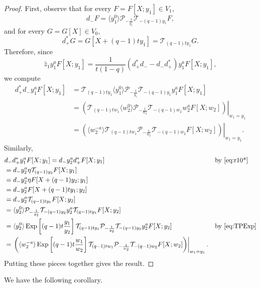 \documentclass[reqno]{amsart}
\theoremstyle{plain}
\theoremstyle{definition}
\theoremstyle{remark}
\DeclareMathOperator{\Exp}{Exp}
\newcommand{\z}{\widehat{z}}
\newcommand{\<}{\langle}
\renewcommand{\>}{\rangle}
\begin{document}
\begin{proof}
    First, observe that for every $F = F[X;y_1]\in V_1$,
    \[ d_- F =\langle y_1^0 \rangle\mathcal{P}_{-\frac{1}{y_1}} \mathcal{T}_{-(q-1)y_1}F, \]
    and for every $G = G[X] \in V_0$,
    \[ d_+^* G = G[X + (q-1) t y_1] = \mathcal{T}_{(q-1)t y_1} G. \]
    Therefore, since
    \[ \z_1 y_1^a F[X;y_1] = \frac{1}{t(1-q)}(d_+^*d_- - d_- d_+^*) y_1^a F[X;y_1], \]
    we compute
    \begin{align*}
        d_+^*d_- y_1^a F[X;y_1] & = \mathcal{T}_{(q-1)t y_1} \langle y_1^0 \rangle\mathcal{P}_{-\frac{1}{y_1}} \mathcal{T}_{-(q-1)y_1} y_1^a F[X;y_1] \\
        & = \left. \left(\mathcal{T}_{(q-1)t w_1} \langle w_2^0 \rangle\mathcal{P}_{-\frac{1}{w_2}} \mathcal{T}_{-(q-1)w_2} w_2^a F[X;w_2]\right) \right\rvert_{w_1=y_1} \\
        & = \left. \left(\langle w_2^{-a} \rangle \mathcal{T}_{(q-1)t w_1} \mathcal{P}_{-\frac{1}{w_2}} \mathcal{T}_{-(q-1)w_2}F[X;w_2]\right) \right\rvert_{w_1=y_1}.
    \end{align*}
    Similarly,
    \begin{align*}
        & d_-d_+^* y_1^a F[X;y_1] = d_- y_2^a d_+^* F[X;y_1] && \text{by \eqref{eq:r10*}} \\
        & = d_- y_2^a \eta \mathcal{T}_{(q-1) y_2} F[X;y_1] \\
        & = d_- y_2^a \eta F[X+(q-1) y_2;y_1] \\
        & = d_- y_2^a  F[X+(q-1) ty_1;y_2] \\
        & = d_- y_2^a  \mathcal{T}_{(q-1)t y_1}F[X;y_2] \\
        & = \langle y_2^0\rangle \mathcal{P}_{-\frac{1}{y_2}} \mathcal{T}_{-(q-1)y_2} y_2^a \mathcal{T}_{(q-1)t y_1}F[X;y_2] \\
        & =\langle y_2^0\rangle \Exp\left[(q-1)t\frac{y_1}{y_2}\right]\mathcal{T}_{(q-1)t y_1} \mathcal{P}_{-\frac{1}{y_2}} \mathcal{T}_{-(q-1)y_2} y_2^a F[X;y_2] && \text{by \eqref{eq:TPExp}} \\
        & = \left. \left(\langle w_2^{-a} \rangle \Exp\left[(q-1)t\frac{w_1}{w_2}\right] \mathcal{T}_{(q-1)t w_1} \mathcal{P}_{-\frac{1}{w_2}} \mathcal{T}_{-(q-1)w_2} F[X;w_2]\right) \right\rvert_{w_1=y_1}.
    \end{align*}
    Putting these pieces together gives the result.
\end{proof}

We have the following corollary.
\end{document}
